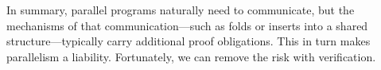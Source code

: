 



In summary, parallel programs naturally need to communicate,
but the mechanisms of that communication---such as folds or
inserts into a shared structure---typically carry additional
proof obligations.  This in turn makes parallelism a liability.
Fortunately, we can remove the risk with verification.





